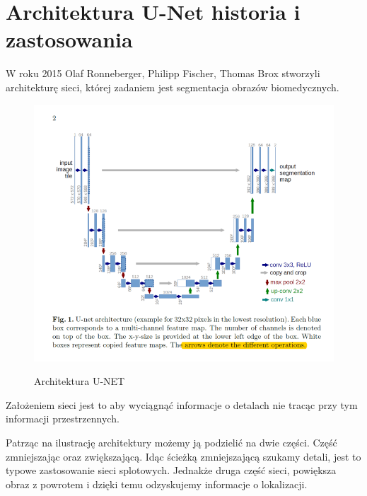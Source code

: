 \documentclass{article}
\begin{document}
\section{Architektura U-Net historia i zastosowania}
W roku 2015 Olaf Ronneberger, Philipp Fischer, Thomas Brox stworzyli architekturę sieci, której zadaniem jest segmentacja obrazów biomedycznych\cite{unetpaper}.
\begin{figure}[H]
    \centering
    \includegraphics[width=\linewidth]{images/unet.png}
    \caption{Architektura U-NET}
    \cite{unet}
    \label{Wizualizacja architektury U-NET}
\end{figure}
Założeniem sieci jest to aby wyciągnąć informacje o detalach nie tracąc przy tym informacji przestrzennych.

Patrząc na ilustrację architektury możemy ją podzielić na dwie części. Część zmniejszając oraz zwiększającą.
Idąc ścieżką zmniejszającą szukamy detali, jest to typowe zastosowanie sieci splotowych. Jednakże druga część sieci, powiększa obraz z powrotem i dzięki temu odzyskujemy informacje o lokalizacji.
\newpage
\end{document}
